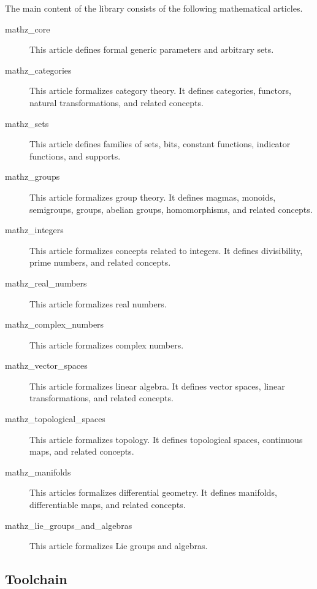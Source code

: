 \documentclass{amsart}
\begin{document}
The main content of the library consists of the following mathematical articles.
\begin{description}
\item[mathz\_core] This article defines formal generic parameters and arbitrary sets.
\item[mathz\_categories] This article formalizes category theory. 
It defines categories, functors, natural transformations, and related concepts.
\item[mathz\_sets] This article defines families of sets, bits, constant functions, indicator functions, and supports.
\item[mathz\_groups] This article formalizes group theory. 
It defines magmas, monoids, semigroups, groups, abelian groups, homomorphisms, and related concepts.
\item[mathz\_integers] This article formalizes concepts related to integers. It defines divisibility, prime numbers, and related concepts.
\item[mathz\_real\_numbers] This article formalizes real numbers.
\item[mathz\_complex\_numbers] This article formalizes complex numbers.
\item[mathz\_vector\_spaces] This article formalizes linear algebra. It defines vector spaces, linear transformations, and related concepts.
\item[mathz\_topological\_spaces] This article formalizes topology. It defines topological spaces, continuous maps, and related concepts.
\item[mathz\_manifolds] This articles formalizes differential geometry. It defines manifolds, differentiable maps, and related concepts.
\item[mathz\_lie\_groups\_and\_algebras] This article formalizes Lie groups and algebras.
\end{description}

\subsection{Toolchain}
\end{document}
